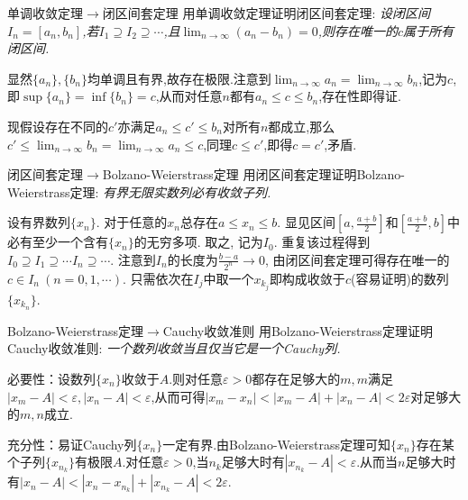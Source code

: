 \begin{exercise}{单调收敛定理$\to$闭区间套定理}
	用单调收敛定理证明闭区间套定理: \textit{设闭区间$I_n=[a_n,b_n]$,若$I_1 \supseteq I_2 \supseteq \cdots $,且$\lim_{n\to \infty} (a_n-b_n)=0$,则存在唯一的$c$属于所有闭区间. }
\end{exercise}
\begin{solution}
	显然$\{ a_n \},\{ b_n \}$均单调且有界,故存在极限.注意到$\lim_{n\to \infty} a_n = \lim_{n\to \infty} b_n$,记为$c$,即$\sup \{ a_n \} = \inf \{ b_n \} = c$,从而对任意$n$都有$a_n \leq c \leq b_n$,存在性即得证.
	
	现假设存在不同的$c'$亦满足$a_n \leq c' \leq b_n$对所有$n$都成立,那么$c' \leq \lim_{n\to \infty} b_n = \lim_{n\to \infty} a_n \leq c$,同理$c \leq c'$,即得$c=c'$,矛盾.
\end{solution}

\begin{exercise}{闭区间套定理$\to$Bolzano-Weierstrass定理}
	用闭区间套定理证明Bolzano-Weierstrass定理: \textit{有界无限实数列必有收敛子列.}
\end{exercise}
\begin{solution}
	设有界数列$\{ x_n \}$. 对于任意的$x_n$总存在$a \leq x_n \leq b$. 显见区间$[a,\frac{a+b}{2}]$和$[\frac{a+b}{2},b]$中必有至少一个含有$\{ x_n \}$的无穷多项. 取之, 记为$I_0$. 重复该过程得到$I_0 \supseteq I_1 \supseteq \cdots I_n \supseteq \cdots$. 注意到$I_n$的长度为$\frac{b-a}{2^n} \to 0$, 由闭区间套定理可得存在唯一的$c \in I_n~(n=0,1,\cdots)$. 只需依次在$I_j$中取一个$x_{k_j}$即构成收敛于$c$(容易证明)的数列$\{ x_{k_n} \}$. 
\end{solution}

\begin{exercise}{Bolzano-Weierstrass定理$\to$Cauchy收敛准则}
	用Bolzano-Weierstrass定理证明Cauchy收敛准则: \textit{一个数列收敛当且仅当它是一个Cauchy列. }
\end{exercise}
\begin{solution}
	必要性：设数列$\{ x_n \}$收敛于$A$.则对任意$\varepsilon >0$都存在足够大的$m,m$满足$|x_m-A|<\varepsilon ,|x_n-A|<\varepsilon$,从而可得$|x_m-x_n|<|x_m-A|+|x_n-A|<2\varepsilon$对足够大的$m,n$成立.
	
	充分性：易证Cauchy列$\{ x_n \}$一定有界.由Bolzano-Weierstrass定理可知$\{ x_n \}$存在某个子列$\{ x_{n_k} \}$有极限$A$.对任意$\varepsilon >0$,当$n_k$足够大时有$|x_{n_k} - A|<\varepsilon$.从而当$n$足够大时有$|x_n-A|<|x_n-x_{n_k}|+|x_{n_k}-A|<2\varepsilon$.
\end{solution}

